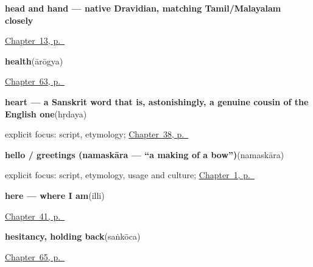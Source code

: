 \noindent\begin{minipage}[t]{\linewidth}
\raggedright
\textbf{head and hand — native Dravidian, matching Tamil/Malayalam closely}\enspace\emph{ }\par
\footnotesize \hyperref[ch:ka-head-and-hand]{Chapter~13, p.~\pageref*{ch:ka-head-and-hand}}
\end{minipage}\par\smallskip

\noindent\begin{minipage}[t]{\linewidth}
\raggedright
\textbf{health}\enspace\emph{}\enspace(ārōgya)\par
\footnotesize \hyperref[ch:ka-health]{Chapter~63, p.~\pageref*{ch:ka-health}}
\end{minipage}\par\smallskip

\noindent\begin{minipage}[t]{\linewidth}
\raggedright
\textbf{heart — a Sanskrit word that is, astonishingly, a genuine cousin of the English one}\enspace\emph{}\enspace(hṛdaya)\par
\footnotesize explicit focus: script, etymology; \hyperref[ch:ka-heart]{Chapter~38, p.~\pageref*{ch:ka-heart}}
\end{minipage}\par\smallskip

\noindent\begin{minipage}[t]{\linewidth}
\raggedright
\textbf{hello / greetings (namaskāra — \textquotedblleft{}a making of a bow\textquotedblright{})}\enspace\emph{}\enspace(namaskāra)\par
\footnotesize explicit focus: script, etymology, usage and culture; \hyperref[ch:greetings]{Chapter~1, p.~\pageref*{ch:greetings}}
\end{minipage}\par\smallskip

\noindent\begin{minipage}[t]{\linewidth}
\raggedright
\textbf{here — where I am}\enspace\emph{}\enspace(illi)\par
\footnotesize \hyperref[ch:kn-pointing-and-asking]{Chapter~41, p.~\pageref*{ch:kn-pointing-and-asking}}
\end{minipage}\par\smallskip

\noindent\begin{minipage}[t]{\linewidth}
\raggedright
\textbf{hesitancy, holding back}\enspace\emph{}\enspace(saṅkōca)\par
\footnotesize \hyperref[ch:ka-manners]{Chapter~65, p.~\pageref*{ch:ka-manners}}
\end{minipage}\par\smallskip

